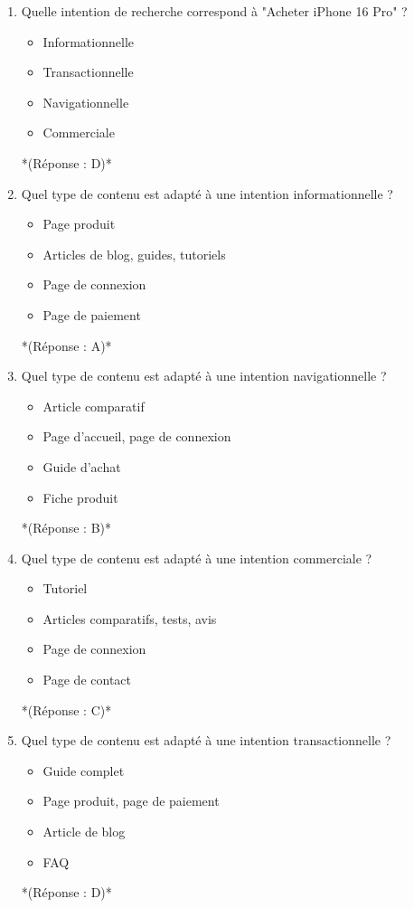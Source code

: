 \documentclass[12pt,a4paper,twoside]{report}
\begin{document}
\begin{enumerate}
\item Quelle intention de recherche correspond à "Acheter iPhone 16 Pro" ?
\begin{itemize}
\item[A)] Informationnelle
\item[B)] Transactionnelle
\item[C)] Navigationnelle
\item[D)] Commerciale
\end{itemize}
*(Réponse : D)*

\item Quel type de contenu est adapté à une intention informationnelle ?
\begin{itemize}
\item[A)] Page produit
\item[B)] Articles de blog, guides, tutoriels
\item[C)] Page de connexion
\item[D)] Page de paiement
\end{itemize}
*(Réponse : A)*

\item Quel type de contenu est adapté à une intention navigationnelle ?
\begin{itemize}
\item[A)] Article comparatif
\item[B)] Page d'accueil, page de connexion
\item[C)] Guide d'achat
\item[D)] Fiche produit
\end{itemize}
*(Réponse : B)*

\item Quel type de contenu est adapté à une intention commerciale ?
\begin{itemize}
\item[A)] Tutoriel
\item[B)] Articles comparatifs, tests, avis
\item[C)] Page de connexion
\item[D)] Page de contact
\end{itemize}
*(Réponse : C)*

\item Quel type de contenu est adapté à une intention transactionnelle ?
\begin{itemize}
\item[A)] Guide complet
\item[B)] Page produit, page de paiement
\item[C)] Article de blog
\item[D)] FAQ
\end{itemize}
*(Réponse : D)*


\end{enumerate}
\end{document}
